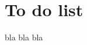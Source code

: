 \documentclass[10pt,a4paper]{article}
\begin{document}
\section{To do list}
bla bla bla
\end{document}
